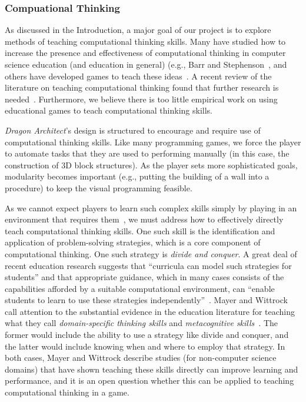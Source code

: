 \documentclass{sig-alternate}
\newcommand{\gametitle}{{\emph{Dragon Architect}}}
\begin{document}
\subsubsection{Compuational Thinking}

As discussed in the Introduction, a major goal of our project is to explore methods of teaching computational thinking skills.
Many have studied how to increase the presence and effectiveness of computational thinking in computer science education (and education in general) (e.g., Barr and Stephenson~\cite{barr2011bringing}, and others have developed games to teach these ideas~\cite{weintrop2013robobuilder, kazimoglu2012serious}.
A recent review of the literature on teaching computational thinking found that further research is needed~\cite{lye2014review}.
Furthermore, we believe there is too little empirical work on using educational games to teach computational thinking skills. 

\gametitle{}'s design is structured to encourage and require use of computational thinking skills.
Like many programming games, we force the player to automate tasks that they are used to performing manually (in this case, the construction of 3D block structures).
As the player sets more sophisticated goals, modularity becomes important (e.g., putting the building of a wall into a procedure) to keep the visual programming feasible. 

As we cannot expect players to learn such complex skills simply by playing in an environment that requires them~\cite{mayer2004should}, we must address how to effectively directly teach computational thinking skills.
One such skill is the identification and application of problem-solving strategies, which is a core component of computational thinking.
One such strategy is \emph{divide and conquer}.
A great deal of recent education research suggests that ``curricula can model such strategies for students'' and that appropriate guidance, which in many cases consists of the capabilities afforded by a suitable computational environment, can ``enable students to learn to use these strategies independently''~\cite{report2010computational}.
Mayer and Wittrock call attention to the substantial evidence in the education literature for teaching what they call \emph{domain-specific thinking skills} and \emph{metacognitive skills}~\cite{mayer1996handbook}.
The former would include the ability to use a strategy like divide and conquer, and the latter would include knowing when and where to employ that strategy.
In both cases, Mayer and Wittrock describe studies (for non-computer science domains) that have shown teaching these skills directly can improve learning and performance, and it is an open question whether this can be applied to teaching computational thinking in a game.
\end{document}
